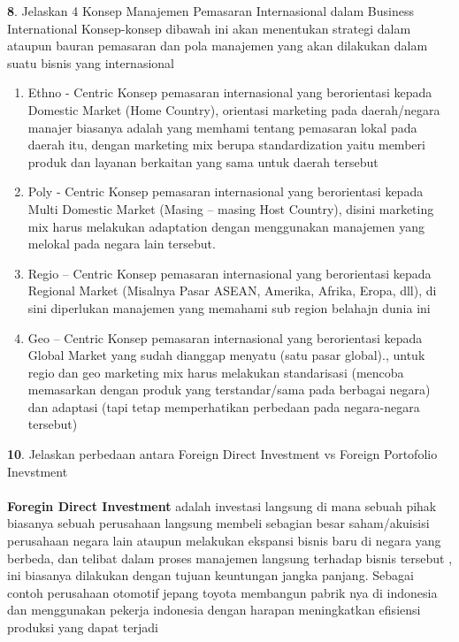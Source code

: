\documentclass{article}
\begin{document}
\noindent\textbf{8}. Jelaskan 4 Konsep Manajemen Pemasaran Internasional dalam Business International
\smallbreak
\noindent Konsep-konsep dibawah ini akan menentukan strategi dalam 
ataupun bauran pemasaran dan pola manajemen yang akan dilakukan 
dalam suatu bisnis yang internasional
\begin{enumerate}
    \item Ethno - Centric
    Konsep pemasaran internasional yang berorientasi kepada Domestic Market 
    (Home Country), orientasi marketing pada daerah/negara manajer biasanya adalah yang memhami tentang pemasaran lokal pada daerah itu, dengan marketing mix berupa standardization  yaitu memberi produk dan layanan berkaitan yang sama untuk daerah tersebut                             
    \item Poly - Centric  Konsep pemasaran internasional 
    yang berorientasi kepada Multi Domestic Market (Masing – masing Host Country), disini marketing mix harus melakukan adaptation dengan menggunakan manajemen yang melokal pada negara lain tersebut.
    \item Regio – Centric  Konsep pemasaran internasional 
    yang berorientasi kepada Regional Market (Misalnya Pasar ASEAN, Amerika, Afrika, Eropa, dll), di sini diperlukan manajemen yang memahami sub region belahajn dunia ini
    \item Geo – Centric   Konsep pemasaran internasional 
    yang berorientasi kepada Global Market yang 
    sudah dianggap menyatu (satu pasar global)., untuk regio dan geo marketing mix harus melakukan standarisasi (mencoba memasarkan dengan produk yang terstandar/sama pada berbagai negara) dan adaptasi (tapi tetap memperhatikan perbedaan pada negara-negara tersebut)
    
\end{enumerate}
\textbf{10}. Jelaskan perbedaan antara Foreign Direct Investment vs Foreign Portofolio Inevstment
\\\\
\textbf{Foregin Direct Investment} adalah 
investasi langsung di mana sebuah pihak 
biasanya sebuah perusahaan langsung membeli 
sebagian besar saham/akuisisi perusahaan negara lain ataupun melakukan ekspansi bisnis baru 
di negara yang berbeda, dan telibat dalam proses manajemen langsung terhadap bisnis tersebut
, ini biasanya dilakukan dengan tujuan keuntungan jangka panjang. Sebagai contoh perusahaan otomotif jepang toyota 
membangun pabrik nya di indonesia 
dan menggunakan pekerja indonesia 
dengan harapan meningkatkan efisiensi produksi yang dapat terjadi 
\end{document}
